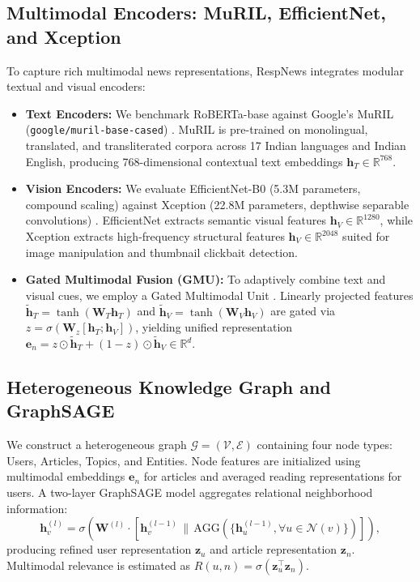 \documentclass[conference]{IEEEtran}
\begin{document}
\subsection{Multimodal Encoders: MuRIL, EfficientNet, and Xception}
To capture rich multimodal news representations, RespNews integrates modular textual and visual encoders:
\begin{itemize}
    \item \textbf{Text Encoders:} We benchmark RoBERTa-base \cite{liu_roberta} against Google's MuRIL (\texttt{google/muril-base-cased}) \cite{khanuja_muril}. MuRIL is pre-trained on monolingual, translated, and transliterated corpora across 17 Indian languages and Indian English, producing 768-dimensional contextual text embeddings $\mathbf{h}_T \in \mathbb{R}^{768}$.
    \item \textbf{Vision Encoders:} We evaluate EfficientNet-B0 (5.3M parameters, compound scaling) \cite{tan_efficientnet} against Xception (22.8M parameters, depthwise separable convolutions) \cite{chollet_xception}. EfficientNet extracts semantic visual features $\mathbf{h}_V \in \mathbb{R}^{1280}$, while Xception extracts high-frequency structural features $\mathbf{h}_V \in \mathbb{R}^{2048}$ suited for image manipulation and thumbnail clickbait detection.
    \item \textbf{Gated Multimodal Fusion (GMU):} To adaptively combine text and visual cues, we employ a Gated Multimodal Unit \cite{arevalo_gmu}. Linearly projected features $\tilde{\mathbf{h}}_T = \tanh(\mathbf{W}_T \mathbf{h}_T)$ and $\tilde{\mathbf{h}}_V = \tanh(\mathbf{W}_V \mathbf{h}_V)$ are gated via $z = \sigma(\mathbf{W}_z [\mathbf{h}_T; \mathbf{h}_V])$, yielding unified representation $\mathbf{e}_n = z \odot \tilde{\mathbf{h}}_T + (1 - z) \odot \tilde{\mathbf{h}}_V \in \mathbb{R}^d$.
\end{itemize}

\subsection{Heterogeneous Knowledge Graph and GraphSAGE}
We construct a heterogeneous graph $\mathcal{G} = (\mathcal{V}, \mathcal{E})$ containing four node types: Users, Articles, Topics, and Entities. Node features are initialized using multimodal embeddings $\mathbf{e}_n$ for articles and averaged reading representations for users. A two-layer GraphSAGE model \cite{hamilton_graphsage} aggregates relational neighborhood information:
\begin{equation}
\mathbf{h}_v^{(l)} = \sigma\left(\mathbf{W}^{(l)} \cdot \left[ \mathbf{h}_v^{(l-1)} \,\|\, \text{AGG}\left(\{\mathbf{h}_u^{(l-1)}, \forall u \in \mathcal{N}(v)\}\right) \right]\right),
\end{equation}
producing refined user representation $\mathbf{z}_u$ and article representation $\mathbf{z}_n$. Multimodal relevance is estimated as $R(u,n) = \sigma(\mathbf{z}_u^\top \mathbf{z}_n)$.
\end{document}
